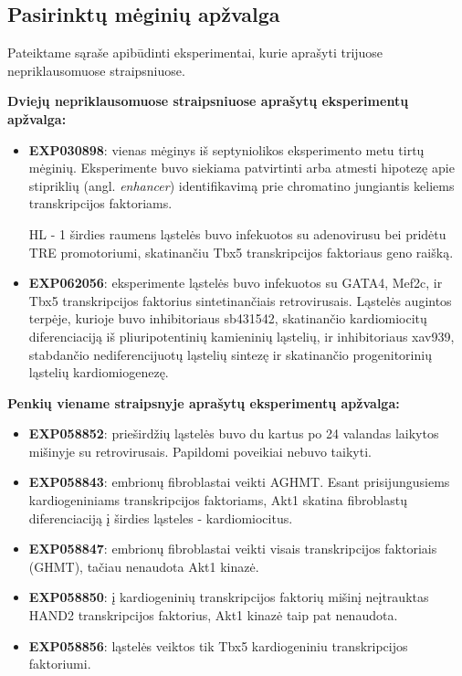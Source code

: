 \documentclass[12pt]{article}
\begin{document}
\subsection{Pasirinktų mėginių apžvalga}
Pateiktame sąraše apibūdinti eksperimentai, kurie aprašyti trijuose
nepriklausomuose straipsniuose.

\textbf{Dviejų nepriklausomuose straipsniuose aprašytų eksperimentų apžvalga:}
\begin{itemize}
    \item \textbf{EXP030898}: vienas mėginys iš septyniolikos eksperimento
        metu tirtų mėginių. Eksperimente buvo siekiama patvirtinti arba
        atmesti hipotezę apie stipriklių (angl. \emph{enhancer})
        identifikavimą prie chromatino jungiantis keliems transkripcijos
        faktoriams.

        HL - 1 širdies raumens ląstelės buvo infekuotos su adenovirusu
        bei pridėtu TRE promotoriumi, skatinančiu Tbx5 transkripcijos
        faktoriaus geno raišką.
    \item \textbf{EXP062056}: eksperimente ląstelės buvo infekuotos su GATA4,
        Mef2c, ir Tbx5 transkripcijos faktorius sintetinančiais retrovirusais.
        Ląstelės augintos terpėje, kurioje buvo inhibitoriaus sb431542,
        skatinančio kardiomiocitų diferenciaciją iš pliuripotentinių
        kamieninių ląstelių, ir inhibitoriaus xav939, stabdančio
        nediferencijuotų ląstelių sintezę ir skatinančio progenitorinių
        ląstelių kardiomiogenezę.
\end{itemize}

\textbf{Penkių viename straipsnyje aprašytų eksperimentų apžvalga:}
\begin{itemize}
    \item \textbf{EXP058852}: prieširdžių ląstelės buvo du kartus po 24
        valandas laikytos mišinyje su retrovirusais. Papildomi poveikiai nebuvo
        taikyti.
    \item \textbf{EXP058843}: embrionų fibroblastai veikti AGHMT. Esant
        prisijungusiems kardiogeniniams transkripcijos faktoriams, Akt1
        skatina fibroblastų diferenciaciją į širdies ląsteles - kardiomiocitus.
    \item \textbf{EXP058847}: embrionų fibroblastai veikti visais transkripcijos
        faktoriais (GHMT), tačiau nenaudota Akt1 kinazė.
    \item \textbf{EXP058850}: į kardiogeninių transkripcijos faktorių mišinį
        neįtrauktas HAND2 transkripcijos faktorius, Akt1 kinazė taip pat
        nenaudota.
    \item \textbf{EXP058856}: ląstelės veiktos tik Tbx5 kardiogeniniu 
        transkripcijos faktoriumi.
  \end{itemize}
\newpage
\end{document}
